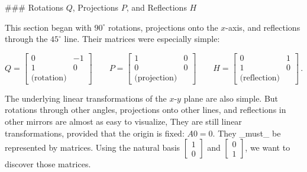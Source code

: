 

### Rotations \(Q\), Projections \(P\), and Reflections \(H\)

This section began with \(90^{\circ}\) rotations, projections onto the \(x\)-axis, and reflections through the \(45^{\circ}\) line. Their matrices were especially simple:

\[Q=\begin{bmatrix}0&-1\\ 1&0\\ \text{(rotation)}\end{bmatrix}\qquad P=\begin{bmatrix}1&0\\ 0&0\\ \text{(projection)}\end{bmatrix}\qquad H=\begin{bmatrix}0&1\\ 1&0\\ \text{(reflection)}\end{bmatrix}\,.\]

The underlying linear transformations of the \(x\)-\(y\) plane are also simple. But rotations through other angles, projections onto other lines, and reflections in other mirrors are almost as easy to visualize, They are still linear transformations, provided that the origin is fixed: \(A0=0\). They _must_ be represented by matrices. Using the natural basis \(\begin{bmatrix}1\\ 0\end{bmatrix}\) and \(\begin{bmatrix}0\\ 1\end{bmatrix}\), we want to discover those matrices.

